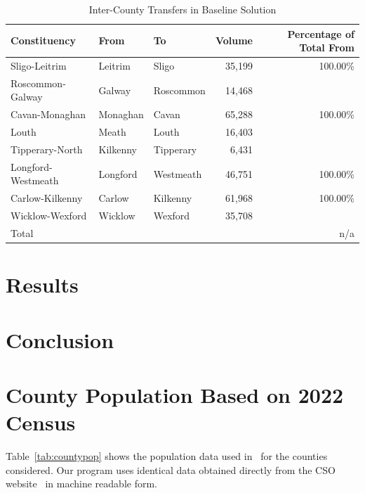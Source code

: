 \documentclass[runningheads]{llncs}
\begin{document}
\begin{table}[htbp]
\caption{\label{tab:baselinetransfer}Inter-County Transfers in Baseline Solution}
\begin{tabular}{lllrr}\toprule
Constituency & From & To & Volume & Percentage of Total From\\ \midrule 
Sligo-Leitrim & Leitrim & Sligo & 35,199 & 100.00\%\\
Roscommon-Galway & Galway & Roscommon & 14,468 & \\
Cavan-Monaghan & Monaghan & Cavan & 65,288& 100.00\%\\
Louth & Meath & Louth & 16,403& \\
Tipperary-North & Kilkenny & Tipperary & 6,431& \\
Longford-Westmeath & Longford & Westmeath & 46,751& 100.00\%\\
Carlow-Kilkenny & Carlow & Kilkenny & 61,968& 100.00\%\\
Wicklow-Wexford & Wicklow & Wexford & 35,708& \\
\midrule
Total & & & & n/a\\
\bottomrule
\end{tabular}
\end{table}



\section{Results}
\label{sec:results}

\section{Conclusion}
\label{sec:conclusion}



%
%




\appendix
\clearpage
\section{County Population Based on 2022 Census}
Table~\ref{tab:countypop} shows the population data used in~\cite{ElectoralCommission2023} for the counties considered. Our program uses identical data obtained directly from the CSO website~\cite{CSO2022} in machine readable form.
\end{document}
